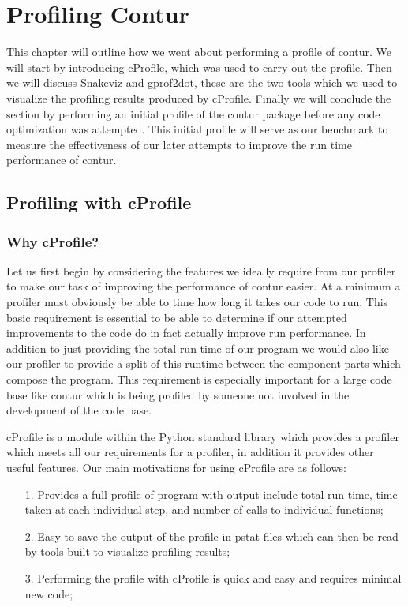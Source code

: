 \chapter{Profiling Contur}
\label{chapterlabel3}

This chapter will outline how we went about performing a profile of contur. We will start by introducing cProfile, which was used to carry out the profile. Then we will discuss Snakeviz and gprof2dot, these are the two tools which we used to visualize the profiling results produced by cProfile. Finally we will conclude the section by performing an initial profile of the contur package before any code optimization was attempted. This initial profile will serve as our benchmark to measure the effectiveness of our later attempts to improve the run time performance of contur.

\section{Profiling with cProfile}

\subsection{Why cProfile?}
Let us first begin by considering the features we ideally require from our profiler to make our task of improving the performance of contur easier. At a minimum a profiler must obviously be able to time how long it takes our code to run. This basic requirement is essential to be able to determine if our attempted improvements to the code do in fact actually improve run performance. In addition to just providing the total run time of our program we would also like our profiler to provide a split of this runtime between the component parts which compose the program. This requirement is especially important for a large code base like contur which is being profiled by someone not involved in the development of the code base.

cProfile is a module within the Python standard library which provides a profiler which meets all our requirements for a profiler, in addition it provides other useful features. Our main motivations for using cProfile are as follows:

\begin{itemize}
\item[1.] Provides a full profile of program with output include total run time, time taken at each individual step, and number of calls to individual functions;
\item[2.] Easy to save the output of the profile in pstat files which can then be read by tools built to visualize profiling results;
\item[3.] Performing the profile with cProfile is quick and easy and requires minimal new code;
\end{itemize}

